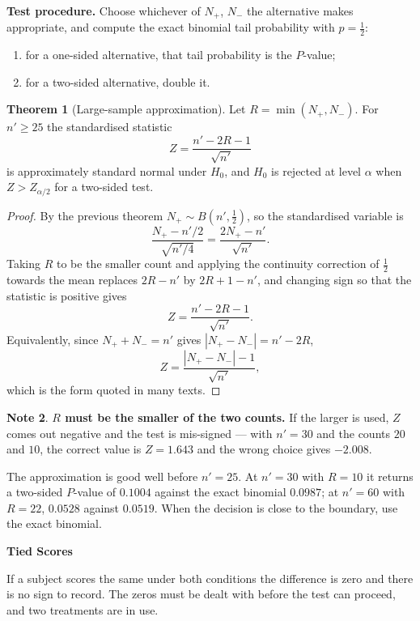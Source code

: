 \documentclass[11pt,a4paper]{article}
\theoremstyle{definition}
\newtheorem{thm}{Theorem}[section]
\newtheorem{note}[thm]{Note}
\begin{document}
\textbf{Test procedure.} Choose whichever of $N_{+}$, $N_{-}$ the alternative
makes appropriate, and compute the exact binomial tail probability with
$p = \tfrac12$:
\begin{enumerate}
\item[(i).] for a one-sided alternative, that tail probability is the $P$-value;
\item[(ii).] for a two-sided alternative, double it.
\end{enumerate}

\begin{thm}[Large-sample approximation]
Let $R = \min\left(N_{+}, N_{-}\right)$. For $n' \geq 25$ the standardised
statistic
$$Z = \dfrac{n' - 2R - 1}{\sqrt{n'}}$$
is approximately standard normal under $H_0$, and $H_0$ is rejected at level
$\alpha$ when $Z > Z_{\alpha/2}$ for a two-sided test.
\end{thm}

\begin{proof}
By the previous theorem $N_{+} \sim B(n',\tfrac12)$, so the standardised variable
is
$$\dfrac{N_{+} - n'/2}{\sqrt{n'/4}} = \dfrac{2N_{+} - n'}{\sqrt{n'}} .$$
Taking $R$ to be the smaller count and applying the continuity correction of
$\tfrac12$ towards the mean replaces $2R - n'$ by $2R + 1 - n'$, and changing sign
so that the statistic is positive gives
$$Z = \dfrac{n' - 2R - 1}{\sqrt{n'}} .$$
Equivalently, since $N_{+} + N_{-} = n'$ gives
$\left|N_{+} - N_{-}\right| = n' - 2R$,
$$Z = \dfrac{\left|N_{+}-N_{-}\right| - 1}{\sqrt{n'}} ,$$
which is the form quoted in many texts.
\end{proof}

\begin{note}
\textbf{$R$ must be the smaller of the two counts.} If the larger is used, $Z$
comes out negative and the test is mis-signed --- with $n' = 30$ and the counts
$20$ and $10$, the correct value is $Z = 1.643$ and the wrong choice gives
$-2.008$.

The approximation is good well before $n' = 25$. At $n' = 30$ with $R = 10$ it
returns a two-sided $P$-value of $0.1004$ against the exact binomial $0.0987$; at
$n' = 60$ with $R = 22$, $0.0528$ against $0.0519$. When the decision is close to
the boundary, use the exact binomial.
\end{note}
\textbf{Tied Scores}

If a subject scores the same under both conditions the difference is zero and
there is no sign to record. The zeros must be dealt with before the test can
proceed, and two treatments are in use.
\end{document}
